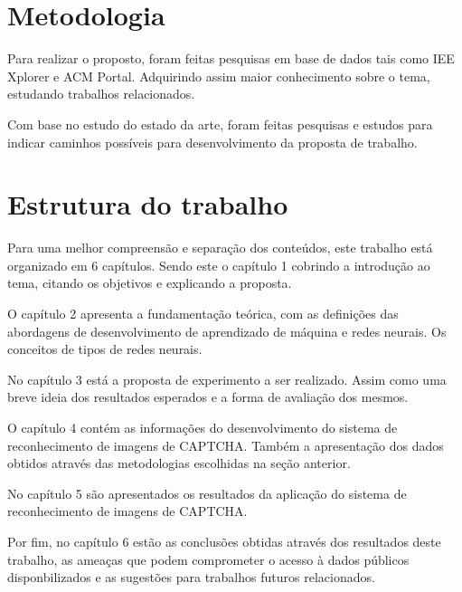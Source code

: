 \section{Metodologia}

Para realizar o proposto, foram feitas pesquisas em base de dados tais
como IEE Xplorer e ACM Portal. Adquirindo assim maior conhecimento
sobre o tema, estudando trabalhos relacionados. 

Com base no estudo do estado da arte, foram feitas pesquisas e
estudos para indicar caminhos possíveis para desenvolvimento da
proposta de trabalho.

\section{Estrutura do trabalho}

Para uma melhor compreensão e separação dos conteúdos, este trabalho
está organizado em 6 capítulos. Sendo este o capítulo 1 cobrindo a
introdução ao tema, citando os objetivos e explicando a proposta.

O capítulo 2 apresenta a fundamentação teórica, com as definições das
abordagens de desenvolvimento de aprendizado de máquina e redes
neurais. Os conceitos de tipos de redes neurais.

No capítulo 3 está a proposta de experimento a ser realizado. Assim
como uma breve ideia dos resultados esperados e a forma de avaliação
dos mesmos.

O capítulo 4 contém as informações do desenvolvimento do sistema de
reconhecimento de imagens de CAPTCHA. Também a apresentação dos dados
obtidos através das metodologias escolhidas na seção anterior.

No capítulo 5 são apresentados os resultados da aplicação do sistema
de reconhecimento de imagens de CAPTCHA.

Por fim, no capítulo 6 estão as conclusões obtidas através dos
resultados deste trabalho, as ameaças que podem comprometer o acesso à
dados públicos disponbilizados e as sugestões para trabalhos futuros
relacionados.